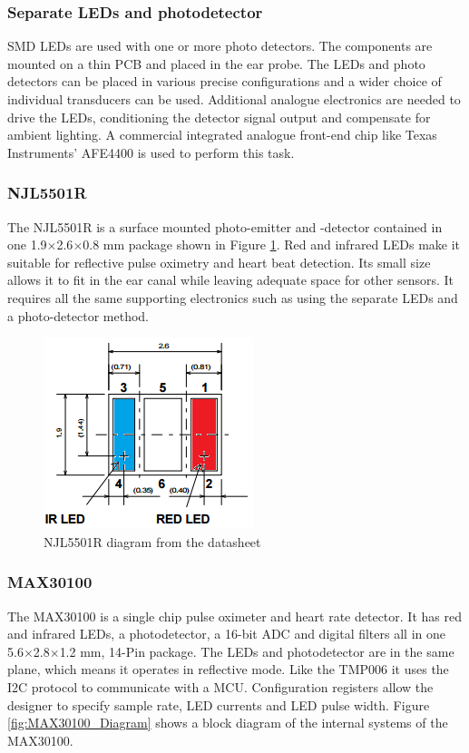 \subsubsection{Separate LEDs and photodetector}
SMD LEDs are used with one or more photo detectors. The components are mounted on a thin PCB and placed in the ear probe. The LEDs and photo detectors can be placed in various precise configurations and a wider choice of individual transducers can be used. Additional analogue electronics are needed to drive the LEDs, conditioning the detector signal output and compensate for ambient lighting. A commercial integrated analogue front-end chip like Texas Instruments' AFE4400 is used to perform this task.

\subsubsection{NJL5501R}
The NJL5501R is a surface mounted photo-emitter and -detector contained in one 1.9$\times$2.6$\times$0.8 mm package shown in Figure \ref{fig:NJL5501R}. Red and infrared LEDs make it suitable for reflective pulse oximetry and heart beat detection. Its small size allows it to fit in the ear canal while leaving adequate space for other sensors. It requires all the same supporting electronics such as using the separate LEDs and a photo-detector method.

 \begin{figure}[h]
   \centering
   \includegraphics[scale=1]{figs/NJL5501R.png}
   \caption{NJL5501R diagram from the datasheet}
   \label{fig:NJL5501R}
\end{figure}

\subsubsection{MAX30100} 
The MAX30100 is a single chip pulse oximeter and heart rate detector. It has red and infrared LEDs, a photodetector, a 16-bit ADC and digital filters all in one 5.6$\times$2.8$\times$1.2 mm, 14-Pin package. The LEDs and photodetector are in the same plane, which means it operates in reflective mode. Like the TMP006 it uses the I2C protocol to communicate with a MCU. Configuration registers allow the designer to specify sample rate, LED currents and LED pulse width. Figure \ref{fig:MAX30100_Diagram} shows a block diagram of the internal systems of the MAX30100.

